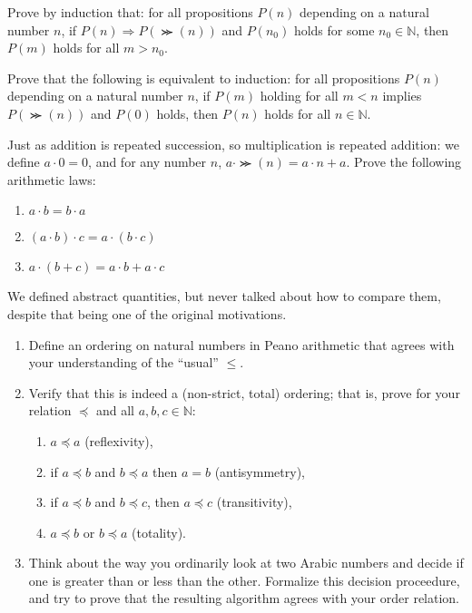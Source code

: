 \begin{prob}
  Prove by induction that: for all propositions $P(n)$ depending on a natural number $n$, if $P(n) \Rightarrow P(\Succ(n))$
  and $P(n_{0})$ holds for some $n_{0} \in \mathbb{N}$, then $P(m)$ holds for all $m > n_{0}$.
\end{prob}

\begin{prob}
  Prove that the following is equivalent to induction: for all propositions $P(n)$ depending on a natural number $n$,
  if $P(m)$ holding for all $m < n$ implies $P(\Succ(n))$ and $P(0)$ holds, then $P(n)$ holds for all $n \in \mathbb{N}$.
\end{prob}

\begin{prob}
  Just as addition is repeated succession, so multiplication is repeated addition: we define $a \cdot 0 = 0$, and for any number $n$,
  $a \cdot \Succ(n) = a \cdot n + a$.
  Prove the following arithmetic laws:
  \begin{enumerate}
  \item $a \cdot b = b \cdot a$
  \item $(a \cdot b) \cdot c = a \cdot (b \cdot c)$
  \item $a \cdot (b + c) = a \cdot b + a \cdot c$
  \end{enumerate}
\end{prob}

\begin{prob}
  We defined abstract quantities, but never talked about how to compare them, despite that being one of the original motivations.
  \begin{enumerate}
  \item Define an ordering on natural numbers in Peano arithmetic that agrees with your understanding of the ``usual'' $\leq$.
  \item Verify that this is indeed a (non-strict, total) ordering; that is, prove for your relation $\preceq$ and all $a, b, c \in \mathbb{N}$:
    \begin{enumerate}
    \item $a \preceq a$ (reflexivity),
    \item if $a \preceq b$ and $b \preceq a$ then $a = b$ (antisymmetry),
    \item if $a \preceq b$ and $b \preceq c$, then $a \preceq c$ (transitivity),
    \item $a \preceq b$ or $b \preceq a$ (totality).
    \end{enumerate}
  \item Think about the way you ordinarily look at two Arabic numbers and decide if one is greater than or less than the other.
    Formalize this decision proceedure, and try to prove that the resulting algorithm agrees with your order relation.
  \end{enumerate}
\end{prob}

